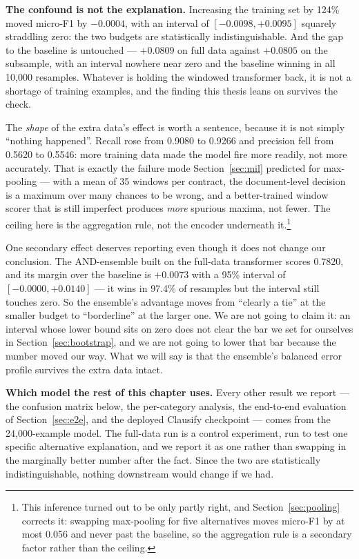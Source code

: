 \textbf{The confound is not the explanation.} Increasing the training set by 124\% moved micro-F1 by $-0.0004$, with an interval of $[-0.0098, +0.0095]$ squarely straddling zero: the two budgets are statistically indistinguishable. And the gap to the baseline is untouched --- $+0.0809$ on full data against $+0.0805$ on the subsample, with an interval nowhere near zero and the baseline winning in all 10{,}000 resamples. Whatever is holding the windowed transformer back, it is not a shortage of training examples, and the finding this thesis leans on survives the check.

The \emph{shape} of the extra data's effect is worth a sentence, because it is not simply ``nothing happened''. Recall rose from 0.9080 to 0.9266 and precision fell from 0.5620 to 0.5546: more training data made the model fire more readily, not more accurately. That is exactly the failure mode Section~\ref{sec:mil} predicted for max-pooling --- with a mean of 35 windows per contract, the document-level decision is a maximum over many chances to be wrong, and a better-trained window scorer that is still imperfect produces \emph{more} spurious maxima, not fewer. The ceiling here is the aggregation rule, not the encoder underneath it.\footnote{This inference turned out to be only partly right, and Section~\ref{sec:pooling} corrects it: swapping max-pooling for five alternatives moves micro-F1 by at most 0.056 and never past the baseline, so the aggregation rule is a secondary factor rather than the ceiling.}

One secondary effect deserves reporting even though it does not change our conclusion. The AND-ensemble built on the full-data transformer scores 0.7820, and its margin over the baseline is $+0.0073$ with a 95\% interval of $[-0.0000, +0.0140]$ --- it wins in 97.4\% of resamples but the interval still touches zero. So the ensemble's advantage moves from ``clearly a tie'' at the smaller budget to ``borderline'' at the larger one. We are not going to claim it: an interval whose lower bound sits on zero does not clear the bar we set for ourselves in Section~\ref{sec:bootstrap}, and we are not going to lower that bar because the number moved our way. What we will say is that the ensemble's balanced error profile survives the extra data intact.

\textbf{Which model the rest of this chapter uses.} Every other result we report --- the confusion matrix below, the per-category analysis, the end-to-end evaluation of Section~\ref{sec:e2e}, and the deployed Clausify checkpoint --- comes from the 24{,}000-example model. The full-data run is a control experiment, run to test one specific alternative explanation, and we report it as one rather than swapping in the marginally better number after the fact. Since the two are statistically indistinguishable, nothing downstream would change if we had.

